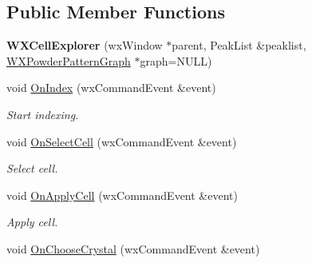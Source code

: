 \subsection*{Public Member Functions}
\begin{DoxyCompactItemize}
\item 
\mbox{\label{class_obj_cryst_1_1_w_x_cell_explorer_ae2414673ed430553421749c0ac1a3d7c}} 
{\bfseries W\+X\+Cell\+Explorer} (wx\+Window $\ast$parent, Peak\+List \&peaklist, \mbox{\hyperlink{class_obj_cryst_1_1_w_x_powder_pattern_graph}{W\+X\+Powder\+Pattern\+Graph}} $\ast$graph=N\+U\+LL)
\item 
\mbox{\label{class_obj_cryst_1_1_w_x_cell_explorer_aef288b141147823a5c236d738458719d}} 
void \mbox{\hyperlink{class_obj_cryst_1_1_w_x_cell_explorer_aef288b141147823a5c236d738458719d}{On\+Index}} (wx\+Command\+Event \&event)
\begin{DoxyCompactList}\small\item\em Start indexing. \end{DoxyCompactList}\item 
\mbox{\label{class_obj_cryst_1_1_w_x_cell_explorer_ab98bfcf68b54db4adf1b7c1c684e9c4d}} 
void \mbox{\hyperlink{class_obj_cryst_1_1_w_x_cell_explorer_ab98bfcf68b54db4adf1b7c1c684e9c4d}{On\+Select\+Cell}} (wx\+Command\+Event \&event)
\begin{DoxyCompactList}\small\item\em Select cell. \end{DoxyCompactList}\item 
\mbox{\label{class_obj_cryst_1_1_w_x_cell_explorer_a19dc864bb2dd7804399bbd1a37bc3108}} 
void \mbox{\hyperlink{class_obj_cryst_1_1_w_x_cell_explorer_a19dc864bb2dd7804399bbd1a37bc3108}{On\+Apply\+Cell}} (wx\+Command\+Event \&event)
\begin{DoxyCompactList}\small\item\em Apply cell. \end{DoxyCompactList}\item 
\mbox{\label{class_obj_cryst_1_1_w_x_cell_explorer_aa0c73bd0b0abffcc706c63bcc479ab4f}} 
void \mbox{\hyperlink{class_obj_cryst_1_1_w_x_cell_explorer_aa0c73bd0b0abffcc706c63bcc479ab4f}{On\+Choose\+Crystal}} (wx\+Command\+Event \&event)

\end{DoxyCompactItemize}
